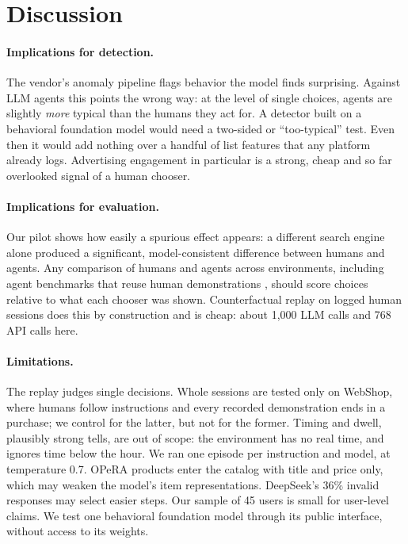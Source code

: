 \section{Discussion}
\label{sec:discussion}

\paragraph{Implications for detection.} The vendor's anomaly pipeline flags behavior the model finds surprising. Against LLM agents this points the wrong way: at the level of single choices, agents are slightly \emph{more} typical than the humans they act for. A detector built on a behavioral foundation model would need a two-sided or ``too-typical'' test. Even then it would add nothing over a handful of list features that any platform already logs. Advertising engagement in particular is a strong, cheap and so far overlooked signal of a human chooser.

\paragraph{Implications for evaluation.} Our pilot shows how easily a spurious effect appears: a different search engine alone produced a significant, model-consistent difference between humans and agents. Any comparison of humans and agents across environments, including agent benchmarks that reuse human demonstrations \cite{yao2022webshop,zeng2023agenttuning}, should score choices relative to what each chooser was shown. Counterfactual replay on logged human sessions does this by construction and is cheap: about 1{,}000 LLM calls and 768 API calls here.

\paragraph{Limitations.} The replay judges single decisions. Whole sessions are tested only on WebShop, where humans follow instructions and every recorded demonstration ends in a purchase; we control for the latter, but not for the former. Timing and dwell, plausibly strong tells, are out of scope: the environment has no real time, and \bgpt{} ignores time below the hour. We ran one episode per instruction and model, at temperature 0.7. OPeRA products enter the catalog with title and price only, which may weaken the model's item representations. DeepSeek's 36\% invalid responses may select easier steps. Our sample of 45 users is small for user-level claims. We test one behavioral foundation model through its public interface, without access to its weights.

